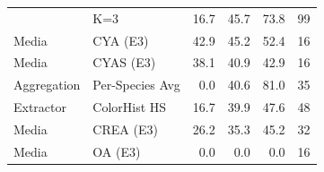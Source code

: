 \begin{table}[ht]
\begin{tabularx}{\textwidth}{@{}l X r r r r@{}}
{K & K=3 & 16.7 & 45.7 & 73.8 & 99 \\
Media & CYA (E3) & 42.9 & 45.2 & 52.4 & 16 \\
Media & CYAS (E3) & 38.1 & 40.9 & 42.9 & 16 \\
Aggregation & Per-Species Avg & 0.0 & 40.6 & 81.0 & 35 \\
Extractor & ColorHist HS & 16.7 & 39.9 & 47.6 & 48 \\
Media & CREA (E3) & 26.2 & 35.3 & 45.2 & 32 \\
Media & OA (E3) & 0.0 & 0.0 & 0.0 & 16 \\
\bottomrule
\end{tabularx}
\end{table}